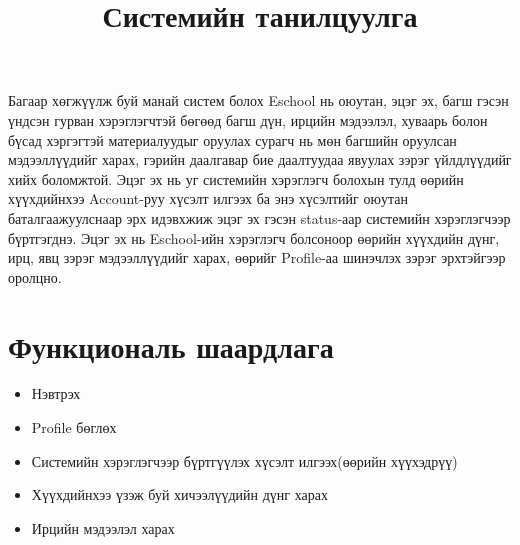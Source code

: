 \documentclass[12pt]{article}
\begin{document}
		\title{Системийн танилцуулга}
Багаар хөгжүүлж буй манай систем болох Eschool  нь оюутан, эцэг эх, багш гэсэн үндсэн гурван  хэрэглэгчтэй бөгөөд багш дүн, ирцийн мэдээлэл, хуваарь болон бүсад хэргэгтэй материалуудыг оруулах сурагч нь мөн багшийн оруулсан мэдээллүүдийг харах, гэрийн даалгавар бие даалтуудаа явуулах зэрэг үйлдлүүдийг хийх боломжтой. Эцэг эх нь уг системийн хэрэглэгч болохын тулд өөрийн хүүхдийнхээ Account-руу хүсэлт илгээх ба энэ хүсэлтийг оюутан баталгаажуулснаар эрх идэвхжиж эцэг эх гэсэн status-аар системийн хэрэглэгчээр бүртгэгднэ. Эцэг эх нь Eschool-ийн хэрэглэгч болсоноор өөрийн хүүхдийн дүнг, ирц, явц зэрэг мэдээллүүдийг харах, өөрийг Profile-аа шинэчлэх зэрэг эрхтэйгээр оролцно.
\section{ Функциональ шаардлага }
\begin{itemize} 
	\item Нэвтрэх
	\item Profile бөглөх
	\item Системийн хэрэглэгчээр бүртгүүлэх хүсэлт илгээх(өөрийн хүүхэдрүү)
	\item Хүүхдийнхээ үзэж буй хичээлүүдийн дүнг харах
	\item Ирцийн мэдээлэл харах
\end{itemize}
\end{document}
